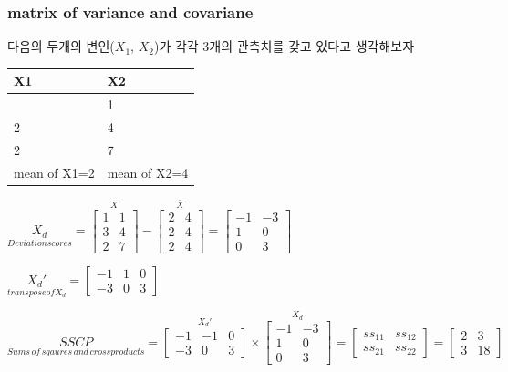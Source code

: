 \documentclass[
]{book}
\begin{document}
\subsubsection{matrix of variance and covariane}\label{matrix-of-variance-and-covariane-1}

다음의 두개의 변인(\(X_{1}\), \(X_{2}\))가 각각 3개의 관측치를 갖고 있다고 생각해보자

\begin{longtable}[]{@{}ll@{}}
\toprule\noalign{}
X1 & X2 \\
\midrule\noalign{}
\endhead
\bottomrule\noalign{}
\endlastfoot
1 & 1 \\
2 & 4 \\
2 & 7 \\
mean of X1=2 & mean of X2=4 \\
\end{longtable}

\(\underset{Deviation scores}{X_{d}}=\overset{X}{\begin{bmatrix}
1 & 1\\
3 & 4\\
2 & 7
\end{bmatrix}}-\overset{\bar{X}}{\begin{bmatrix}
 2& 4\\
 2& 4\\
 2& 4
\end{bmatrix}}=\begin{bmatrix}
-1 & -3\\
 1&0 \\
 0&3
\end{bmatrix}\)

\(\underset{transpose of X_{d}}{{X_{d}}'}=\begin{bmatrix}
-1 & 1 & 0\\
-3 & 0 & 3
\end{bmatrix}\)

\(\underset{Sums\, of\, sqaures\, and\, crossproducts}{SSCP}=\overset{{X_{d}}'}{\begin{bmatrix}
-1 & -1 & 0\\
-3 & 0 & 3
\end{bmatrix}}\times \overset{X_{d}}{\begin{bmatrix}
-1 & -3\\
1 &0 \\
0 &3
\end{bmatrix}}=\begin{bmatrix}
ss_{11} & ss_{12}\\
ss_{21} & ss_{22}
\end{bmatrix}=\begin{bmatrix}
2 &3 \\
3 &18
\end{bmatrix}\)
\end{document}
